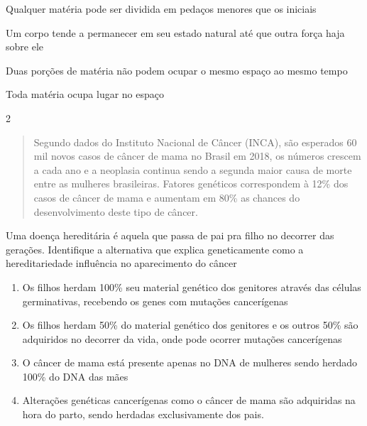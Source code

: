 \begin{escolha}
\item
  Qualquer matéria pode ser dividida em pedaços menores que os iniciais
\item
  Um corpo tende a permanecer em seu estado natural até que outra força
  haja sobre ele
\item
  Duas porções de matéria não podem ocupar o mesmo espaço ao mesmo tempo
\item
  Toda matéria ocupa lugar no espaço
\end{escolha}


\num{2}
\begin{quote}
Segundo dados do Instituto Nacional de Câncer (INCA), são esperados
60 mil novos casos de câncer de mama no Brasil em 2018, os números
crescem a cada ano e a neoplasia continua sendo a segunda maior causa
de morte entre as mulheres brasileiras. Fatores genéticos correspondem
à 12\% dos casos de câncer de mama e aumentam em 80\% as chances do
desenvolvimento deste tipo de câncer.

\end{quote}

Uma doença hereditária é aquela que passa de pai pra filho no decorrer
das gerações. Identifique a alternativa que explica geneticamente como a
hereditariedade influência no aparecimento do câncer

\begin{enumerate}
\item
  Os filhos herdam 100\% seu material genético dos genitores através das
  células germinativas, recebendo os genes com mutações cancerígenas
\item
  Os filhos herdam 50\% do material genético dos genitores e os outros
  50\% são adquiridos no decorrer da vida, onde pode ocorrer mutações
  cancerígenas
\item
  O câncer de mama está presente apenas no DNA de mulheres sendo herdado
  100\% do DNA das mães
\item
  Alterações genéticas cancerígenas como o câncer de mama são adquiridas
  na hora do parto, sendo herdadas exclusivamente dos pais.
\end{enumerate}

